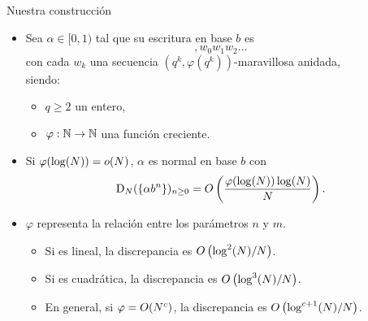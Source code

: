 \documentclass[spanish,xcolor={table}]{beamer}
\begin{document}

\begin{frame}{Nuestra construcción}
  \begin{itemize}
    \item Sea $\alpha \in [0, 1)$ tal que su escritura en base $b$ es
    \[ {,}w_0w_1w_2\dots \]
    con cada $w_k$ una secuencia $(q^k, \varphi(q^k))$-maravillosa anidada,  \\ siendo:
    \begin{itemize}
      \item $q \geq 2$ un entero,
      \item $\varphi: \mathbb{N} \to \mathbb{N}$ una función creciente.
    \end{itemize}
    \item Si $\varphi(\log(N)) = o(N)$, $\alpha$ es normal en base $b$ con
      \[ \operatorname{D}_{N}(\lbrace \alpha b^n \rbrace)_{n\geq0}
      = O\left( \frac{\varphi(\log(N))\log(N)}{N} \right). \]
    \item $\varphi$ representa la relación entre los parámetros $n$ y $m$.
      \begin{itemize}
        \item Si es lineal, la discrepancia es $O \left(\log^2(N)/N\right)$.
        \item Si es cuadrática, la discrepancia es $O \left(\log^3(N)/N\right)$.
        \item En general, si $\varphi = O(N^c)$, la discrepancia es $O \left(\log^{c+1}(N)/N\right)$.
      \end{itemize}
  \end{itemize}
\end{frame}

\end{document}
